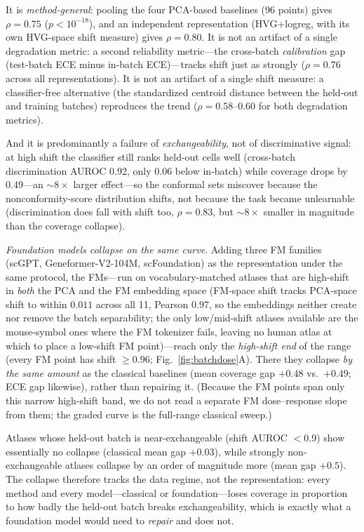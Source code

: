 \documentclass[11pt]{article}
\begin{document}
It is \emph{method-general}: pooling the four PCA-based baselines (96 points) gives $\rho=0.75$ ($p<10^{-18}$), and an independent representation (HVG+logreg, with its own HVG-space shift measure) gives $\rho=0.80$. It is not an artifact of a single degradation metric: a second reliability metric---the cross-batch \emph{calibration} gap (test-batch ECE minus in-batch ECE)---tracks shift just as strongly ($\rho=0.76$ across all representations). It is not an artifact of a single shift measure: a classifier-free alternative (the standardized centroid distance between the held-out and training batches) reproduces the trend ($\rho=0.58$--$0.60$ for both degradation metrics).

And it is predominantly a failure of \emph{exchangeability}, not of discriminative signal: at high shift the classifier still ranks held-out cells well (cross-batch discrimination AUROC 0.92, only 0.06 below in-batch) while coverage drops by 0.49---an ${\sim}8\times$ larger effect---so the conformal sets miscover because the nonconformity-score distribution shifts, not because the task became unlearnable (discrimination does fall with shift too, $\rho=0.83$, but ${\sim}8\times$ smaller in magnitude than the coverage collapse).

\emph{Foundation models collapse on the same curve}. Adding three FM families (scGPT, Geneformer-V2-104M, scFoundation) as the representation under the same protocol, the FMs---run on vocabulary-matched atlases that are high-shift in \emph{both} the PCA and the FM embedding space (FM-space shift tracks PCA-space shift to within $0.011$ across all 11, Pearson $0.97$, so the embeddings neither create nor remove the batch separability; the only low/mid-shift atlases available are the mouse-symbol ones where the FM tokenizer fails, leaving no human atlas at which to place a low-shift FM point)---reach only the \emph{high-shift end} of the range (every FM point has shift $\ge 0.96$; Fig.~\ref{fig:batchdose}A). There they collapse \emph{by the same amount} as the classical baselines (mean coverage gap $+0.48$ vs.\ $+0.49$; ECE gap likewise), rather than repairing it. (Because the FM points span only this narrow high-shift band, we do not read a separate FM dose--response slope from them; the graded curve is the full-range classical sweep.)

Atlases whose held-out batch is near-exchangeable (shift AUROC $<0.9$) show essentially no collapse (classical mean gap $+0.03$), while strongly non-exchangeable atlases collapse by an order of magnitude more (mean gap $+0.5$). The collapse therefore tracks the data regime, not the representation: every method and every model---classical or foundation---loses coverage in proportion to how badly the held-out batch breaks exchangeability, which is exactly what a foundation model would need to \emph{repair} and does not.
\end{document}

